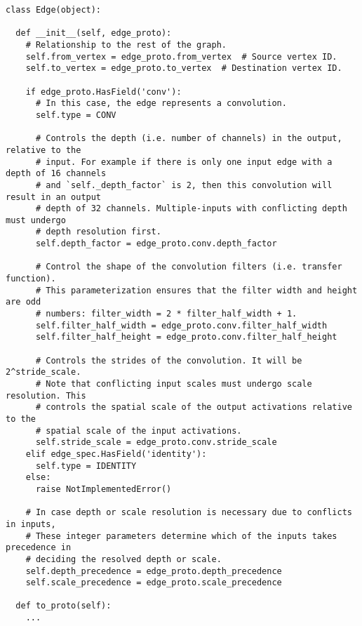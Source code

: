 \documentclass{article}
\begin{document}
\begin{lstlisting}
class Edge(object):

  def __init__(self, edge_proto):
    # Relationship to the rest of the graph.
    self.from_vertex = edge_proto.from_vertex  # Source vertex ID.
    self.to_vertex = edge_proto.to_vertex  # Destination vertex ID.
    
    if edge_proto.HasField('conv'):
      # In this case, the edge represents a convolution.
      self.type = CONV
      
      # Controls the depth (i.e. number of channels) in the output, relative to the
      # input. For example if there is only one input edge with a depth of 16 channels
      # and `self._depth_factor` is 2, then this convolution will result in an output
      # depth of 32 channels. Multiple-inputs with conflicting depth must undergo
      # depth resolution first.
      self.depth_factor = edge_proto.conv.depth_factor
      
      # Control the shape of the convolution filters (i.e. transfer function).
      # This parameterization ensures that the filter width and height are odd
      # numbers: filter_width = 2 * filter_half_width + 1.
      self.filter_half_width = edge_proto.conv.filter_half_width
      self.filter_half_height = edge_proto.conv.filter_half_height
      
      # Controls the strides of the convolution. It will be 2^stride_scale.
      # Note that conflicting input scales must undergo scale resolution. This
      # controls the spatial scale of the output activations relative to the
      # spatial scale of the input activations.
      self.stride_scale = edge_proto.conv.stride_scale
    elif edge_spec.HasField('identity'):
      self.type = IDENTITY
    else:
      raise NotImplementedError()
      
    # In case depth or scale resolution is necessary due to conflicts in inputs,
    # These integer parameters determine which of the inputs takes precedence in
    # deciding the resolved depth or scale.
    self.depth_precedence = edge_proto.depth_precedence
    self.scale_precedence = edge_proto.scale_precedence

  def to_proto(self):
    ...
\end{lstlisting}
\end{document}

